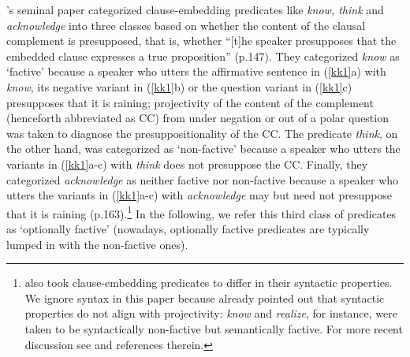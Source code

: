 \documentclass[11pt,fleqn]{article}
\newcommand{\6}{\mbox{$[\hspace*{-.6mm}[$}}
\newcommand{\9}{\mbox{$]\hspace*{-.6mm}]$}}
\newcommand{\citepos}[1]{\citeauthor{#1}'s \citeyear{#1}}
\begin{document}
\citepos{kiparsky-kiparsky70} seminal paper categorized clause-embedding predicates like {\em know, think} and {\em acknowledge} into three classes based on whether the content of the clausal complement is presupposed, that is, whether ``[t]he speaker presupposes that the embedded clause expresses a true proposition'' (p.147). They categorized {\em know} as `factive' because a speaker who utters the affirmative sentence in (\ref{kk1}a) with {\em know}, its negative variant in (\ref{kk1}b) or the question variant in (\ref{kk1}c) presupposes that it is raining; projectivity of the content of the complement (henceforth abbreviated as CC) from under negation or out of a polar question was taken to diagnose the presuppositionality of the CC. The predicate {\em think}, on the other hand, was categorized as `non-factive' because a speaker who utters the variants in (\ref{kk1}a-c) with {\em think} does not presuppose the CC. Finally, they categorized {\em acknowledge} as neither factive nor non-factive because a speaker who utters the variants in (\ref{kk1}a-c) with {\em acknowledge} may but need not presuppose that it is raining (p.163).\footnote{\citet{kiparsky-kiparsky70} also took clause-embedding predicates to differ in their syntactic properties. We ignore syntax in this paper because \citet[fn.3]{kiparsky-kiparsky70} already pointed out that syntactic properties do not align with projectivity: {\em know} and {\em realize}, for instance, were taken to be syntactically non-factive but semantically factive. For more recent discussion see \citealt{white-rawlins-nels2018} and references therein.} In the following, we refer this third class of predicates as `optionally factive' (nowadays, optionally factive predicates are typically lumped in with the non-factive ones).
\end{document}
